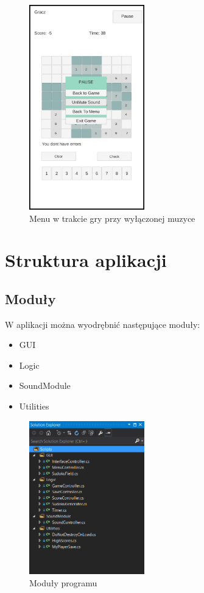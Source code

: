\documentclass[a4paper, 11pt]{article}
\begin{document}
\begin{figure}[H]
	\centering
	\includegraphics[width=5cm]{zrzuty/11.png}
	\caption{Menu w trakcie gry przy wyłączonej muzyce}
	\label{fig:menu_pause2}
\end{figure}





\vfill
	\newpage
\section{Struktura aplikacji}
\subsection{Moduły}
W aplikacji można wyodrębnić następujące moduły:
\begin{itemize}
	\item GUI
	\item Logic
	\item SoundModule
	\item Utilities
\end{itemize}
\begin{figure}[H]
	\centering
	\includegraphics[width=5cm]{zrzuty/modules.png}
	\caption{Moduły programu}
	\label{fig:modules}
\end{figure}
\end{document}
